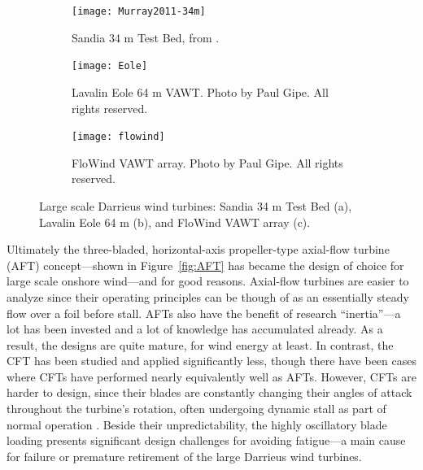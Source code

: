 \begin{figure}
    \centering

    \begin{subfigure}[b]{0.595\textwidth}
        \centering
        
        \texttt{[image: Murray2011-34m]}
        
        \caption{Sandia 34 m Test Bed, from \cite{Murray2011}.}
        
        \label{fig:Sandia-34m}
    \end{subfigure}
    \hfill
    \begin{subfigure}[b]{0.355\textwidth}
        \centering
        
        \texttt{[image: Eole]}
        
        \caption{Lavalin Eole 64 m VAWT. Photo by Paul Gipe. All rights
            reserved.}
        
        \label{fig:Eole}
    \end{subfigure}
    
    \begin{subfigure}[b]{0.8\textwidth}
        \centering
        
        \texttt{[image: flowind]}
        
        \caption{FloWind VAWT array. Photo by Paul Gipe. All rights reserved.}
        
        \label{fig:FloWind}
    \end{subfigure}
    
    \caption{Large scale Darrieus wind turbines: Sandia 34 m Test Bed (a),
        Lavalin Eole 64 m (b), and FloWind VAWT array (c).}
    
    \label{fig:Darrieus}
\end{figure}


Ultimately the three-bladed, horizontal-axis propeller-type axial-flow turbine
(AFT) concept---shown in Figure~\ref{fig:AFT} has became the design of choice
for large scale onshore wind---and for good reasons. Axial-flow turbines are
easier to analyze since their operating principles can be though of as an
essentially steady flow over a foil before stall. AFTs also have the benefit of
research ``inertia''---a lot has been invested and a lot of knowledge has
accumulated already. As a result, the designs are quite mature, for wind energy
at least. In contrast, the CFT has been studied and applied significantly less,
though there have been cases where CFTs have performed nearly equivalently well
as AFTs. However, CFTs are harder to design, since their blades are constantly
changing their angles of attack throughout the turbine's rotation, often
undergoing dynamic stall as part of normal operation \cite{Para2002}. Beside
their unpredictability, the highly oscillatory blade loading presents
significant design challenges for avoiding fatigue---a main cause for failure or
premature retirement of the large Darrieus wind turbines.

